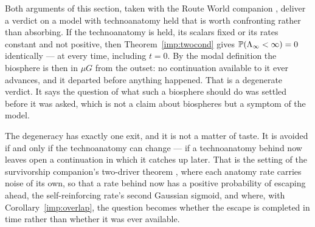 \begin{remark}
\label{hr:rem:forcesprocess}
Both arguments of this section, taken with
the Route World companion \cite{GoldenRouteWorld}, deliver a verdict on a model with technoanatomy held
that is worth confronting rather than absorbing. If the technoanatomy is held, its scalars fixed or its rates constant and not positive, then
Theorem~\ref{imp:twocond} gives
$\mathbb{P}(\Lambda_\infty<\infty)=0$ identically --- at every time, including
$t=0$. By the modal definition the biosphere is then in $\mu G$ from the
outset: no continuation available to it ever advances, and it departed
before anything happened. That is a degenerate verdict. It says the
question of what such a biosphere should do was settled before it was
asked, which is not a claim about biospheres but a symptom of the
model.

The degeneracy has exactly one exit, and it is not a matter of taste.
It is avoided if and only if the technoanatomy can change --- if a
technoanatomy behind now leaves open a continuation in which it catches
up later. That is the setting of the survivorship companion's two-driver
theorem \cite{GoldenSurvivorship}, where each anatomy rate carries noise of
its own, so that a rate behind now has a positive probability of
escaping ahead, the self-reinforcing rate's second Gaussian sigmoid, and
where, with Corollary~\ref{imp:overlap}, the question becomes whether the
escape is completed in time rather than whether it was ever available.


\end{remark}
